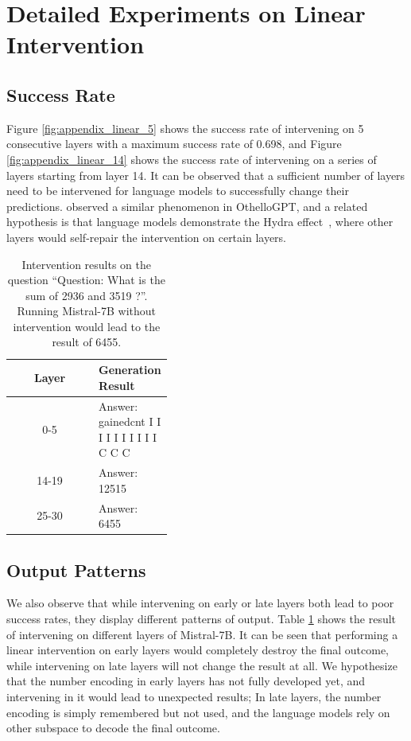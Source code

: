 \documentclass[11pt]{article}
\begin{document}
\section{Detailed Experiments on Linear Intervention}
\label{sec:appendix_linear}
\subsection{Success Rate}
Figure \ref{fig:appendix_linear_5} shows the success rate of intervening on 5 consecutive layers with a maximum success rate of 0.698, and Figure \ref{fig:appendix_linear_14} shows the success rate of intervening on a series of layers starting from layer 14. 
It can be observed that a sufficient number of layers need to be intervened for language models to successfully change their predictions.
\citet{nanda2023emergent} observed a similar phenomenon in OthelloGPT, and a related hypothesis is that language models demonstrate the Hydra effect~\cite{mcgrath2023hydra}, where other layers would self-repair the intervention on certain layers.

\begin{table}[htbp]
    \centering
    \begin{tabular}{c|p{0.4\linewidth}}
    \hline
    Layer & Generation Result \\
    \hline
    0-5 & Answer:  gainedcnt I I I I I I I I I I C C C \\
    14-19 & Answer: 12515 \\
    25-30 & Answer: 6455 \\
    \hline
    \end{tabular}
    \caption{Intervention results on the question ``Question: What is the sum of 2936 and 3519 ?''. Running Mistral-7B without intervention would lead to the result of 6455.}
    \label{tab:appendix_linear_example}
\end{table}

\subsection{Output Patterns}
We also observe that while intervening on early or late layers both lead to poor success rates, they display different patterns of output.
Table \ref{tab:appendix_linear_example} shows the result of intervening on different layers of Mistral-7B. 
It can be seen that performing a linear intervention on early layers would completely destroy the final outcome, while intervening on late layers will not change the result at all.
We hypothesize that the number encoding in early layers has not fully developed yet, and intervening in it would lead to unexpected results; In late layers, the number encoding is simply remembered but not used, and the language models rely on other subspace to decode the final outcome.
\end{document}
